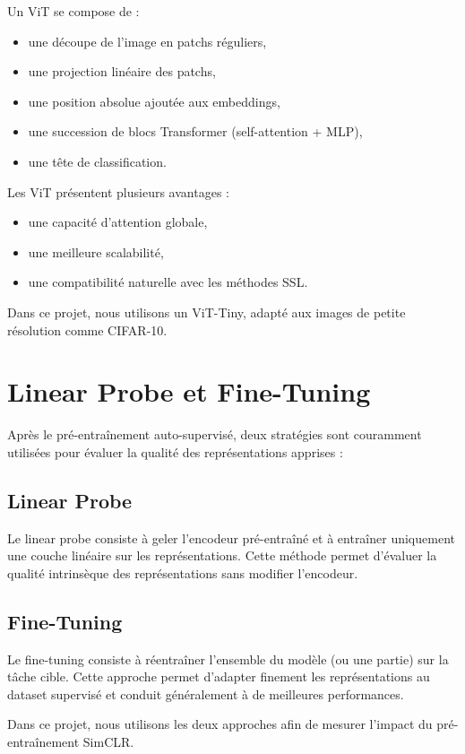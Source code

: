 \documentclass[12pt,a4paper]{report}
\begin{document}
	Un ViT se compose de :
	\begin{itemize}
		\item une découpe de l’image en patchs réguliers,
		\item une projection linéaire des patchs,
		\item une position absolue ajoutée aux embeddings,
		\item une succession de blocs Transformer (self-attention + MLP),
		\item une tête de classification.
	\end{itemize}
	
	Les ViT présentent plusieurs avantages :
	\begin{itemize}
		\item une capacité d’attention globale,
		\item une meilleure scalabilité,
		\item une compatibilité naturelle avec les méthodes SSL.
	\end{itemize}
	
	Dans ce projet, nous utilisons un ViT-Tiny, adapté aux images de petite résolution comme CIFAR-10.
	
	\section{Linear Probe et Fine-Tuning}
	
	Après le pré-entraînement auto-supervisé, deux stratégies sont couramment utilisées pour évaluer la qualité des représentations apprises :
	
	\subsection*{Linear Probe}
	Le linear probe consiste à geler l’encodeur pré-entraîné et à entraîner uniquement une couche linéaire sur les représentations. Cette méthode permet d’évaluer la qualité intrinsèque des représentations sans modifier l’encodeur.
	
	\subsection*{Fine-Tuning}
	Le fine-tuning consiste à réentraîner l’ensemble du modèle (ou une partie) sur la tâche cible. Cette approche permet d’adapter finement les représentations au dataset supervisé et conduit généralement à de meilleures performances.
	
	Dans ce projet, nous utilisons les deux approches afin de mesurer l’impact du pré-entraînement SimCLR.
	
\end{document}
